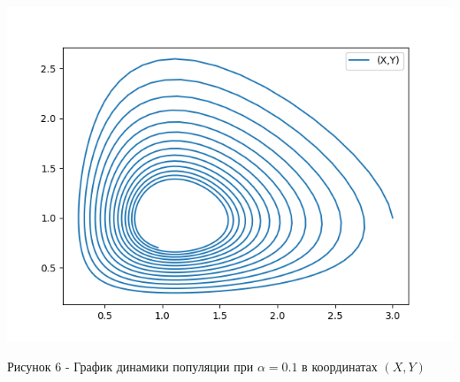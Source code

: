 \documentclass[a4paper,14pt]{extreport}
\begin{document}
    \begin{center}
    \begin{minipage}[htb]{0.8\linewidth}
    \includegraphics[width=14cm]{5.png}
    \end{minipage}
    \end{center}
    \begin{center}
        Рисунок 6 - График динамики популяции при $\alpha = 0.1$ в координатах $(X,Y)$  
    \end{center}
\end{document}
